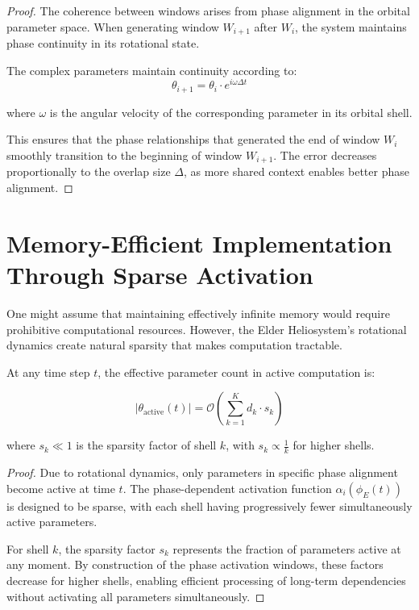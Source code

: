 \begin{proof}
The coherence between windows arises from phase alignment in the orbital parameter space. When generating window $W_{i+1}$ after $W_i$, the system maintains phase continuity in its rotational state.

The complex parameters maintain continuity according to:
\begin{equation}
\theta_{i+1} = \theta_i \cdot e^{i\omega \Delta t}
\end{equation}

where $\omega$ is the angular velocity of the corresponding parameter in its orbital shell.

This ensures that the phase relationships that generated the end of window $W_i$ smoothly transition to the beginning of window $W_{i+1}$. The error decreases proportionally to the overlap size $\Delta$, as more shared context enables better phase alignment.
\end{proof}

\section{Memory-Efficient Implementation Through Sparse Activation}

One might assume that maintaining effectively infinite memory would require prohibitive computational resources. However, the Elder Heliosystem's rotational dynamics create natural sparsity that makes computation tractable.

\begin{theorem}
At any time step $t$, the effective parameter count in active computation is:

\begin{equation}
|\theta_{\text{active}}(t)| = \mathcal{O}(\sum_{k=1}^K d_k \cdot s_k)
\end{equation}

where $s_k \ll 1$ is the sparsity factor of shell $k$, with $s_k \propto \frac{1}{k}$ for higher shells.
\end{theorem}

\begin{proof}
Due to rotational dynamics, only parameters in specific phase alignment become active at time $t$. The phase-dependent activation function $\alpha_i(\phi_E(t))$ is designed to be sparse, with each shell having progressively fewer simultaneously active parameters.

For shell $k$, the sparsity factor $s_k$ represents the fraction of parameters active at any moment. By construction of the phase activation windows, these factors decrease for higher shells, enabling efficient processing of long-term dependencies without activating all parameters simultaneously.
\end{proof}

